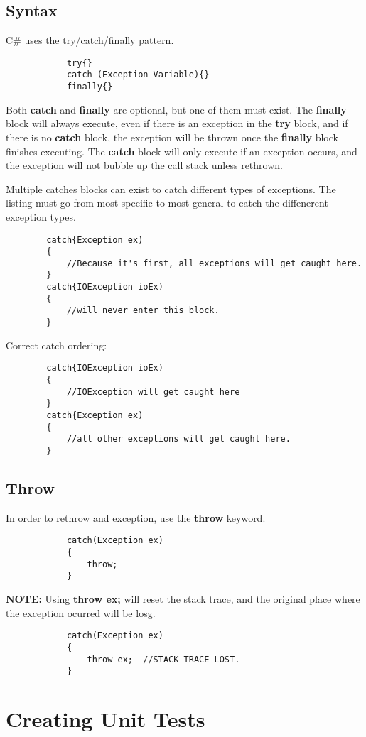 \documentclass {amsart}
\begin{document}
	\subsection{Syntax}  C\# uses the try/catch/finally pattern.
		\begin{lstlisting}
			try{}
			catch (Exception Variable){}
			finally{}
		\end{lstlisting}
	Both {\bf catch} and {\bf finally} are optional, but one of them must exist.  The {\bf finally} block will always execute, even if there is an exception in the {\bf try} block, and if there is no {\bf catch} block, the exception will be thrown once the {\bf finally} block finishes executing.  The {\bf catch} block will only execute if an exception occurs, and the exception will not bubble up the call stack unless rethrown.  
		
	Multiple catches blocks can exist to catch different types of exceptions.  The listing must go from most specific to most general to catch the diffenerent exception types. 

	\begin{lstlisting}
		catch{Exception ex)
		{
			//Because it's first, all exceptions will get caught here.
		}
		catch{IOException ioEx)
		{
			//will never enter this block. 
		}
	\end{lstlisting}
	
	Correct catch ordering:

	\begin{lstlisting}
		catch{IOException ioEx)
		{
			//IOException will get caught here
		}
		catch{Exception ex)
		{
			//all other exceptions will get caught here.
		}
	\end{lstlisting}
	\subsection{Throw}  In order to rethrow and exception, use the {\bf throw} keyword.  
		\begin{lstlisting}
			catch(Exception ex)
			{
				throw;
			}
		\end{lstlisting}
	{\bf NOTE:} Using {\bf throw ex;} will reset the stack trace, and the original place where the exception ocurred will be losg.
		\begin{lstlisting}
			catch(Exception ex)
			{
				throw ex;  //STACK TRACE LOST.
			}
		\end{lstlisting}
		

\section{Creating Unit Tests}
\end{document}
